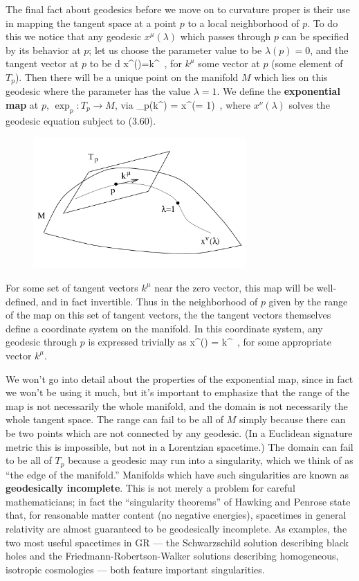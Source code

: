 \documentclass[12pt]{article}
\begin{document}
The final fact about geodesics before we move on to curvature proper
is their use in mapping the tangent space at a point $p$ to a local
neighborhood of $p$.  To do this we notice that any geodesic 
$x^\mu(\lambda)$ which passes through $p$ can be specified by its
behavior at $p$; let us choose the parameter value to be 
$\lambda(p)=0$, and the tangent vector at $p$ to be 
\be
  {{d x^\mu}}()=k^\mu\ ,\label{3.60}
\ee
for $k^\mu$ some vector at $p$ (some element of $T_p$).  Then
there will be a unique point on the manifold $M$ which lies on
this geodesic where the
parameter has the value $\lambda=1$.  We define the {\bf exponential
map} at $p$, $\exp_p :T_p\rightarrow M$, via
\be
  \exp_p(k^\mu) = x^\nu(\lambda = 1)\ ,\label{3.61}
\ee
where $x^\nu(\lambda)$ solves the geodesic equation subject to (3.60).
\begin{figure}
  \centerline{
  \includegraphics[height=5cm]{pdf/three6}}
\end{figure}
For some set of tangent vectors $k^\mu$ near the zero vector, 
this map will be well-defined, and in fact invertible.  Thus in the
neighborhood of $p$ given by the range of the map on this set of
tangent vectors, the the tangent vectors themselves define a coordinate
system on the manifold.  In this coordinate system, any geodesic
through $p$ is expressed trivially as
\be
  x^\mu(\lambda) = \lambda k^\mu\ ,\label{3.62}
\ee
for some appropriate vector $k^\mu$.

We won't go into detail about the properties of the exponential map,
since in fact we won't be using it much, but it's important to emphasize
that the range of the map is not necessarily the whole manifold, and the
domain is not necessarily the whole tangent space.  The range can fail
to be all of $M$ simply because there can be two points which are not
connected by any geodesic.  (In a Euclidean signature metric this is 
impossible, but not in a Lorentzian spacetime.)  The domain can fail
to be all of $T_p$ because a geodesic may run into a singularity, which
we think of as ``the edge of the manifold.''  Manifolds which have
such singularities are known as {\bf geodesically incomplete}.  This
is not merely a problem for careful mathematicians; in fact the
``singularity theorems'' of Hawking and Penrose state that, for
reasonable matter content (no negative energies), spacetimes in
general relativity are almost guaranteed to be geodesically incomplete.
As examples, the two most useful spacetimes in GR --- the Schwarzschild
solution describing black holes and the Friedmann-Robertson-Walker
solutions describing homogeneous, isotropic cosmologies --- both feature
important singularities.
\end{document}
